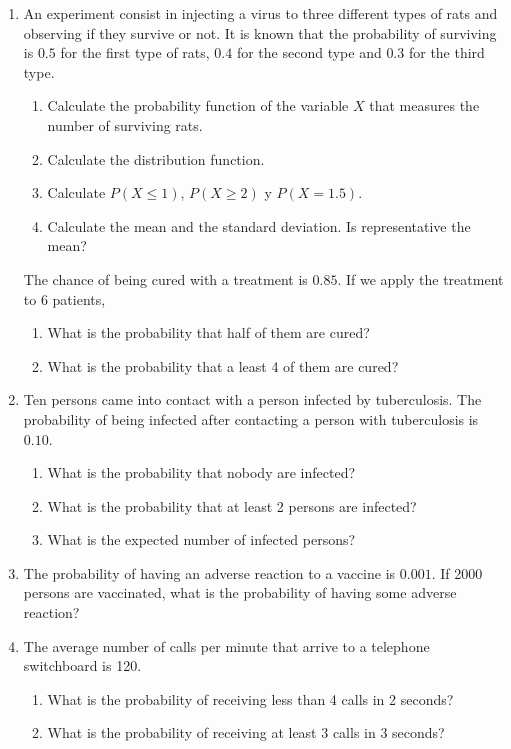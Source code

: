 \begin{enumerate}[leftmargin=*,resume]
\item An experiment consist in injecting a virus to three different types of rats and observing if they survive or not. 
It is known that the probability of surviving is $0.5$ for the first type of rats, $0.4$ for the second type and $0.3$
for the third type.
\begin{enumerate}
\item Calculate the probability function of the variable $X$ that measures the number of surviving rats.
\item Calculate the distribution function.
\item Calculate $P(X\leq 1)$, $P(X\geq 2)$ y $P(X=1.5)$.
\item Calculate the mean and the standard deviation. 
Is representative the mean?
\end{enumerate}

\iem The chance of being cured with a treatment is $0.85$. 
If we apply the treatment to 6 patients,
\begin{enumerate}
\item What is the probability that half of them are cured?
\item What is the probability that a least 4 of them are cured?
\end{enumerate}

\item Ten persons came into contact with a person infected by tuberculosis. 
The probability of being infected after contacting a person with tuberculosis is $0.10$.
\begin{enumerate}
\item What is the probability that nobody are infected?
\item What is the probability that at least 2 persons are infected?
\item What is the expected number of infected persons? 
\end{enumerate}

\item The probability of having an adverse reaction to a vaccine is $0.001$. 
If 2000 persons are vaccinated, what is the probability of having some adverse reaction?

\item The average number of calls per minute that arrive to a telephone switchboard is 120. 
\begin{enumerate}
\item What is the probability of receiving less than 4 calls in 2 seconds?
\item What is the probability of receiving at least 3 calls in 3 seconds?
\end{enumerate}


\end{enumerate}
